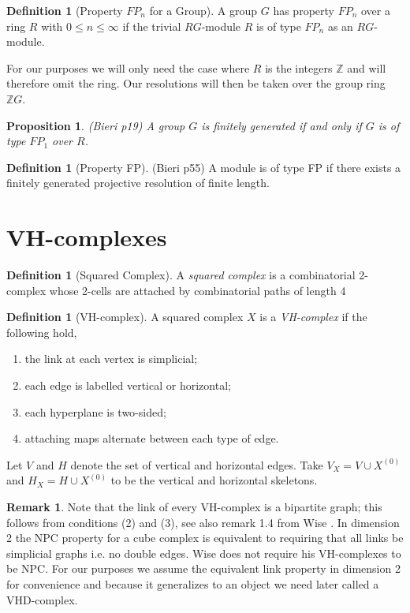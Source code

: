 \documentclass[12pt,parskip=full]{report}
\theoremstyle{plain}
\newtheorem{prop}[thm]{Proposition}
\theoremstyle{definition}
\newtheorem{rmk}[thm]{Remark}
\newtheorem{dfn}[thm]{Definition}
\begin{document}
\begin{dfn}
[Property \(FP_n\) for a Group]

A group \(G\) has property \(FP_n\) over a ring \(R\) with \(0\leq n\leq \infty\) if the trivial \(RG\)-module \(R\) is of type \(FP_n\) as an \(RG\)-module.
\end{dfn}

For our purposes we will only need the case where \(R\) is the integers \(\mathbb{Z}\) and will therefore omit the ring. Our resolutions will then be taken over the group ring \(\mathbb{Z}G\).

\begin{prop}
(Bieri p19)
A group \(G\) is finitely generated if and only if \(G\) is of type \(FP_1\) over \(R\).
\end{prop}

\begin{dfn}
[Property FP]
(Bieri p55)
A module is of type FP if there exists a finitely generated projective resolution of finite length.
\end{dfn}

\section{VH-complexes}

\begin{dfn}
    [Squared Complex]
    A \emph{squared complex} is a combinatorial 2-complex whose 2-cells are attached by combinatorial paths of length 4
\end{dfn}

\begin{dfn}
    [VH-complex]
    A squared complex $X$ is a \emph{VH-complex} if the following hold,
    \begin{enumerate}
        \item the link at each vertex is simplicial;
        \item each edge is labelled vertical or horizontal;
        \item each hyperplane is two-sided;
        \item attaching maps alternate between each type of edge.
    \end{enumerate}
    Let $V$ and $H$ denote the set of vertical and horizontal edges. Take $V_X = V \cup X^{(0)}$ and $H_X = H \cup X^{(0)}$ to be the vertical and horizontal skeletons. 
\end{dfn}

\begin{rmk}
Note that the link of every VH-complex is a bipartite graph; this follows from conditions (2) and (3), see also remark 1.4 from Wise \cite{wisethesis}. In dimension 2 the NPC property for a cube complex is equivalent to requiring that all links be simplicial graphs i.e. no double edges. Wise does not require his VH-complexes to be NPC. For our purposes we assume the equivalent link property in dimension 2 for convenience and because it generalizes to an object we need later called a VHD-complex.
\end{rmk}
\end{document}

